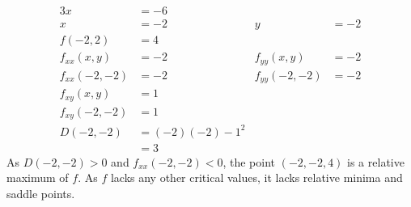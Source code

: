 \documentclass[11pt]{article}
\begin{document}
\begin{enumerate}
\begin{itemize}[ ]
\begin{align*}
								3x &= -6 \\
								x &= -2 &
									y &= -2 \\
							f(-2, 2) &= 4 \\
							f_{xx}(x, y) &= -2 &
								f_{yy}(x, y) &= -2 \\
							f_{xx}(-2, -2) &= -2 &
								f_{yy}(-2, -2) &= -2 \\
							f_{xy}(x, y) &= 1 \\
							f_{xy}(-2, -2) &= 1 \\
							D(-2,-2) &= (-2)(-2) - 1^2 \\
								&= 3
						\end{align*}
						As $D(-2, -2) > 0$ and $f_{xx}(-2, -2) < 0$, the point $(-2, -2, 4)$ is a relative maximum of $f$. As $f$ lacks any other critical values, it lacks relative minima and saddle points.
				\end{itemize}
		\end{enumerate}
\end{document}
